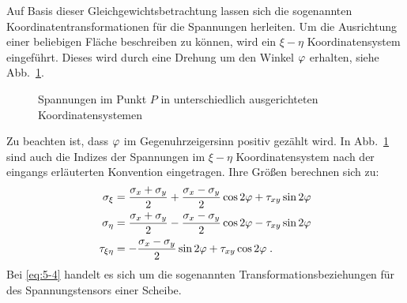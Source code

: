 Auf Basis dieser Gleichgewichtsbetrachtung lassen sich die sogenannten Koordinatentransformationen für die Spannungen herleiten.
Um die Ausrichtung einer beliebigen Fläche beschreiben zu können, wird ein $\xi - \eta$ Koordinatensystem eingeführt.
Dieses wird durch eine Drehung um den Winkel $\varphi$ erhalten, siehe Abb.~\ref{fig:5-4}. 
%
\begin{figure}[h!]
	\centering
	
	\caption{Spannungen im Punkt $P$ in unterschiedlich ausgerichteten Koordinatensystemen}
	\label{fig:5-4}
\end{figure}
%
Zu beachten ist, dass $\varphi$ im Gegenuhrzeigersinn positiv gezählt wird. 
In Abb.~\ref{fig:5-4} sind auch die Indizes der Spannungen im $\xi - \eta$ Koordinatensystem nach der eingangs erläuterten Konvention eingetragen.
Ihre Größen berechnen sich zu:
%
\begin{equation}
	\begin{split}
	\sigma_\xi &= \dfrac{\sigma_x+\sigma_y}{2}+\dfrac{\sigma_x-\sigma_y}{2}\cos 2\varphi + \tau_{xy}\sin 2\varphi \\
	\sigma_\eta &= \dfrac{\sigma_x+\sigma_y}{2}-\dfrac{\sigma_x-\sigma_y}{2}\cos 2\varphi - \tau_{xy}\sin 2\varphi \\ 
	\tau_{\xi\eta} &= -\dfrac{\sigma_x-\sigma_y}{2}\sin 2\varphi + \tau_{xy}\cos 2\varphi \; .
	\end{split}
\label{eq:5-4}
\end{equation}
%
Bei \eqref{eq:5-4} handelt es sich um die sogenannten Transformationsbeziehungen für des Spannungstensors einer Scheibe.

